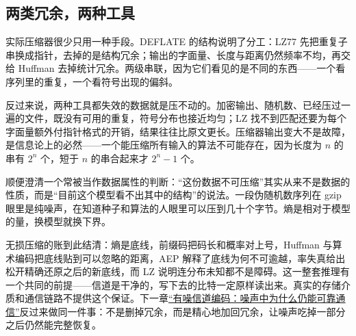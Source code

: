 \subsection{两类冗余，两种工具}

实际压缩器很少只用一种手段。DEFLATE 的结构说明了分工：LZ77 先把重复子串换成指针，去掉的是结构冗余；输出的字面量、长度与距离仍然频率不均，再交给 Huffman 去掉统计冗余。两级串联，因为它们看见的是不同的东西——一个看序列里的重复，一个看符号出现的偏斜。

反过来说，两种工具都失效的数据就是压不动的。加密输出、随机数、已经压过一遍的文件，既没有可用的重复，符号分布也接近均匀；LZ 找不到匹配还要为每个字面量额外付指针格式的开销，结果往往比原文更长。压缩器输出变大不是故障，是信息论上的必然——一个能压缩所有输入的算法不可能存在，因为长度为 \(n\) 的串有 \(2^n\) 个，短于 \(n\) 的串合起来才 \(2^n-1\) 个。

顺便澄清一个常被当作数据属性的判断：``这份数据不可压缩''其实从来不是数据的性质，而是``目前这个模型看不出其中的结构''的说法。一段伪随机数序列在 gzip 眼里是纯噪声，在知道种子和算法的人眼里可以压到几十个字节。熵是相对于模型的量，换模型就换下界。

无损压缩的账到此结清：熵是底线，前缀码把码长和概率对上号，Huffman 与算术编码把底线贴到可以忽略的距离，AEP 解释了底线为何不可逾越，率失真给出松开精确还原之后的新底线，而 LZ 说明连分布未知都不是障碍。这一整套推理有一个共同的前提——信道是干净的，写下去的比特一定原样读出来。真实的存储介质和通信链路不提供这个保证。下一章\hyperref[ch:058]{``有噪信道编码：噪声中为什么仍能可靠通信''}反过来做同一件事：不是删掉冗余，而是精心地加回冗余，让噪声吃掉一部分之后仍然能完整恢复。
